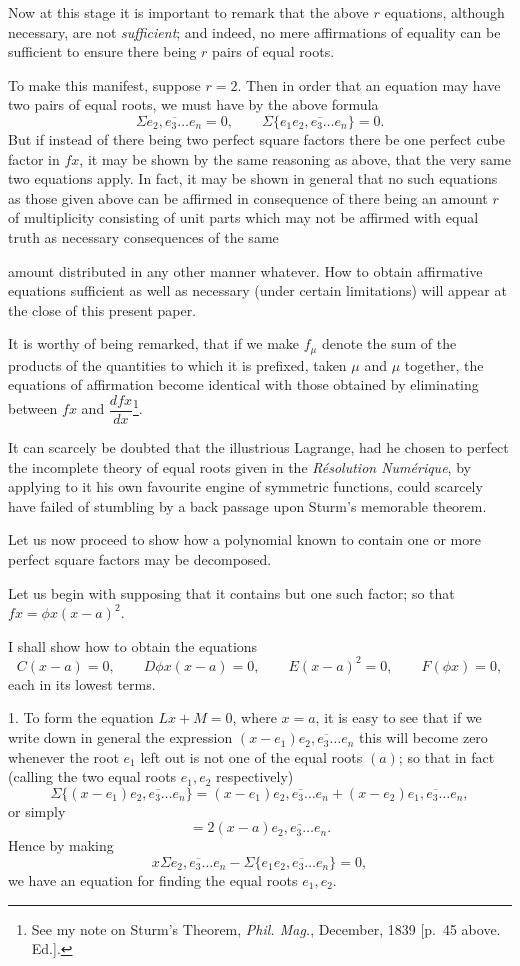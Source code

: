 \documentclass[11pt]{article}
\newcommand{\sourcepage}[1]{\marginpar{\scriptsize p.~#1}}
\newcommand{\pgram}[1]{\overline{#1}}
\begin{document}
Now at this stage it is important to remark that the above $r$ equations, although necessary, are not \emph{sufficient}; and indeed, no mere affirmations of equality can be sufficient to ensure there being $r$ pairs of equal roots.

To make this manifest, suppose $r=2$. Then in order that an equation may have two pairs of equal roots, we must have by the above formula
\[
 \Sigma\pgram{e_2,e_3\ldots e_n}=0,
 \qquad
 \Sigma\{e_1\pgram{e_2,e_3\ldots e_n}\}=0.
\]
But if instead of there being two perfect square factors there be one perfect cube factor in $fx$, it may be shown by the same reasoning as above, that the very same two equations apply. In fact, it may be shown in general that no such equations as those given above can be affirmed in consequence of there being an amount $r$ of multiplicity consisting of unit parts which may not be affirmed with equal truth as necessary consequences of the same

\sourcepage{71}
amount distributed in any other manner whatever. How to obtain affirmative equations sufficient as well as necessary (under certain limitations) will appear at the close of this present paper.

It is worthy of being remarked, that if we make $f_\mu$ denote the sum of the products of the quantities to which it is prefixed, taken $\mu$ and $\mu$ together, the equations of affirmation become identical with those obtained by eliminating between $fx$ and $\dfrac{dfx}{dx}$\footnote{See my note on Sturm's Theorem, \emph{Phil. Mag.}, December, 1839 [p.~45 above. Ed.].}.

It can scarcely be doubted that the illustrious Lagrange, had he chosen to perfect the incomplete theory of equal roots given in the \emph{R\'esolution Num\'erique}, by applying to it his own favourite engine of symmetric functions, could scarcely have failed of stumbling by a back passage upon Sturm's memorable theorem.

Let us now proceed to show how a polynomial known to contain one or more perfect square factors may be decomposed.

Let us begin with supposing that it contains but one such factor; so that $fx=\phi x(x-a)^2$.

I shall show how to obtain the equations
\[
 C(x-a)=0,\qquad D\phi x(x-a)=0,\qquad E(x-a)^2=0,\qquad F(\phi x)=0,
\]
each in its lowest terms.

1. To form the equation $Lx+M=0$, where $x=a$, it is easy to see that if we write down in general the expression $(x-e_1)\pgram{e_2,e_3\ldots e_n}$ this will become zero whenever the root $e_1$ left out is not one of the equal roots $(a)$; so that in fact (calling the two equal roots $e_1,e_2$ respectively)
\[
\Sigma\{(x-e_1)\pgram{e_2,e_3\ldots e_n}\}
=(x-e_1)\pgram{e_2,e_3\ldots e_n}+(x-e_2)\pgram{e_1,e_3\ldots e_n},
\]
or simply
\[
=2(x-a)\pgram{e_2,e_3\ldots e_n}.
\]
Hence by making
\[
 x\Sigma\pgram{e_2,e_3\ldots e_n}-
 \Sigma\{e_1\pgram{e_2,e_3\ldots e_n}\}=0,
\]
we have an equation for finding the equal roots $e_1,e_2$.
\end{document}
